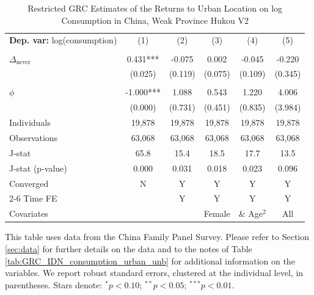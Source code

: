 \begin{table}[htbp] \centering \begin{threeparttable}
 \caption{Restricted GRC Estimates of the Returns to Urban Location on log Consumption in China, Weak Province Hukou V2} 
 \label{tab:GRC_CHN_weak_v2_consumption_urban_unb} 
\begin{tabular}{l ccccc} \toprule  \textbf{Dep. var:}  log(consumption) 
                    &\multicolumn{1}{c}{(1)}   &\multicolumn{1}{c}{(2)}   &\multicolumn{1}{c}{(3)}   &\multicolumn{1}{c}{(4)}   &\multicolumn{1}{c}{(5)}   \\
                    &               &               &               &               &               \\
\addlinespace
$\Delta_{\text{never}}$&       0.431***&      -0.075   &       0.002   &      -0.045   &      -0.220   \\
                    &     (0.025)   &     (0.119)   &     (0.075)   &     (0.109)   &     (0.345)   \\
                    &               &               &               &               &               \\
\addlinespace
$\phi$              &      -1.000***&       1.088   &       0.543   &       1.220   &       4.006   \\
                    &     (0.000)   &     (0.731)   &     (0.451)   &     (0.835)   &     (3.984)   \\
\addlinespace
Individuals         &      19,878   &      19,878   &      19,878   &      19,878   &      19,878   \\
Observations        &      63,068   &      63,068   &      63,068   &      63,068   &      63,068   \\
J-stat              &        65.8   &        15.4   &        18.5   &        17.7   &        13.5   \\
J-stat (p-value)    &       0.000   &       0.031   &       0.018   &       0.023   &       0.096   \\
Converged           &           N   &           Y   &           Y   &           Y   &           Y   \\
\cmidrule{2-6} Time FE & & Y & Y & Y & Y \\ Covariates & & & Female & \& Age$^2$ & All \\ \bottomrule \end{tabular} \begin{tablenotes}[flushleft] \footnotesize \item{This table uses data from the China Family Panel Survey. Please refer to Section \ref{sec:data} for further details on the data and to the notes of Table \ref{tab:GRC_IDN_consumption_urban_unb} for additional information on the variables. We report robust standard errors, clustered at the individual level, in parentheses. Stars denote: $^{*} p<0.10$; $^{**} p<0.05$; $^{***} p<0.01$.} \end{tablenotes} \end{threeparttable} \end{table}
